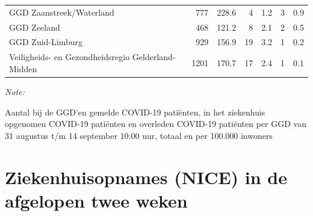 \documentclass[
  english,
  man,floatsintext]{apa6}
\begin{document}
\begin{table}
\begin{threeparttable}
\begin{tabular}{lrrrrrr}
GGD Zaanstreek/Waterland & 777 & 228.6 & 4 & 1.2 & 3 & 0.9\\
GGD Zeeland & 468 & 121.2 & 8 & 2.1 & 2 & 0.5\\
GGD Zuid-Limburg & 929 & 156.9 & 19 & 3.2 & 1 & 0.2\\
Veiligheids- en Gezondheidsregio Gelderland-Midden & 1201 & 170.7 & 17 & 2.4 & 1 & 0.1\\
\bottomrule
\end{tabular}
\begin{tablenotes}
\item \textit{Note: } 
\item Aantal bij de GGD’en gemelde COVID-19 patiënten, in het ziekenhuis opgenomen COVID-19 patiënten en overleden COVID-19 patiënten per GGD van 31 augustus t/m 14 september 10:00 uur, totaal en per 100.000 inwoners
\end{tablenotes}
\end{threeparttable}
\endgroup{}
\end{table}

\newpage

\hypertarget{ziekenhuisopnames-nice-in-de-afgelopen-twee-weken}{%
\section{Ziekenhuisopnames (NICE) in de afgelopen twee weken}\label{ziekenhuisopnames-nice-in-de-afgelopen-twee-weken}}
\end{document}
